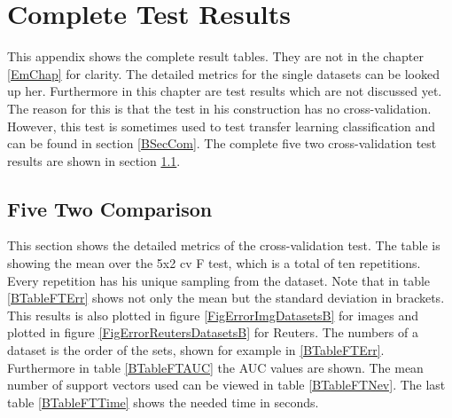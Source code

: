 \chapter{Complete Test Results}\label{appaB}
This appendix shows the complete result tables.
They are not in the chapter \ref{EmChap} for clarity.
The detailed metrics for the single datasets can be looked up her.
Furthermore in this chapter are test results which are not discussed yet. 
The reason for this is that the test in his construction has no cross-validation.
However, this test is sometimes used to test transfer learning classification \cite{Long.} and can be found in section \ref{BSecCom}.
The complete five two cross-validation test results are shown in section \ref{BSecFT}.

\section{Five Two Comparison}\label{BSecFT}
This section shows the detailed metrics of the cross-validation test.
The table is showing the mean over the 5x2 cv F test, which is a total of ten repetitions.
Every repetition has his unique sampling from the dataset. 
Note that in table \ref{BTableFTErr} shows not only the mean but the standard deviation in brackets.
This results is also plotted in figure \ref{FigErrorImgDatasetsB} for images and plotted in figure \ref{FigErrorReutersDatasetsB} for Reuters.
The numbers of a dataset is the order of the sets, shown for example in \ref{BTableFTErr}.
Furthermore in table \ref{BTableFTAUC} the \acs{AUC} values are shown. 
The mean number of support vectors used can be viewed in table \ref{BTableFTNev}.
The last table \ref{BTableFTTime} shows the needed time in seconds.  

